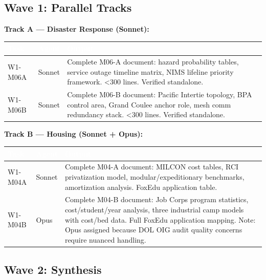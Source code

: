 \documentclass[11pt,letterpaper]{article}
\newcommand{\tableheader}[1]{\textbf{\sffamily\textcolor{white}{#1}}}
\begin{document}
\subsection{Wave 1: Parallel Tracks}

\textbf{Track A --- Disaster Response (Sonnet):}
\begin{center}
\begin{tabularx}{\textwidth}{L{2.5cm}L{2cm}X}
\toprule
{}
\tableheader{Task} & \tableheader{Agent} & \tableheader{Output} \\
\midrule
W1-M06A & Sonnet & Complete M06-A document: hazard probability tables, service outage timeline matrix, NIMS lifeline priority framework. \textless300 lines. Verified standalone. \\
W1-M06B & Sonnet & Complete M06-B document: Pacific Intertie topology, BPA control area, Grand Coulee anchor role, mesh comm redundancy stack. \textless300 lines. Verified standalone. \\
\bottomrule
\end{tabularx}
\end{center}

\textbf{Track B --- Housing (Sonnet + Opus):}
\begin{center}
\begin{tabularx}{\textwidth}{L{2.5cm}L{2cm}X}
\toprule
{}
\tableheader{Task} & \tableheader{Agent} & \tableheader{Output} \\
\midrule
W1-M04A & Sonnet & Complete M04-A document: MILCON cost tables, RCI privatization model, modular/expeditionary benchmarks, amortization analysis. FoxEdu application table. \\
W1-M04B & Opus & Complete M04-B document: Job Corps program statistics, cost/student/year analysis, three industrial camp models with cost/bed data. Full FoxEdu application mapping. Note: Opus assigned because DOL OIG audit quality concerns require nuanced handling. \\
\bottomrule
\end{tabularx}
\end{center}

\subsection{Wave 2: Synthesis}
\end{document}
